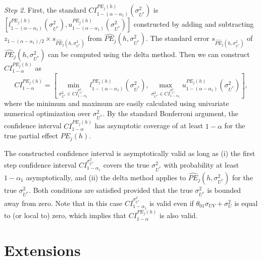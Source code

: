 \documentclass[11pt]{article}
\begin{document}
\noindent \textit{Step 2}. First, the standard $CI_{1-\left( \alpha -\alpha
_{1}\right) }^{PE_{j}(h)}\left( \sigma _{U^{\ast }}^{2}\right) $ is $\left[
l_{1-\left( \alpha -\alpha _{1}\right) }^{PE_{j}(h)}\left( \sigma _{U^{\ast
}}^{2}\right) ,u_{1-\left( \alpha -\alpha _{1}\right) }^{PE_{j}(h)}\left(
\sigma _{U^{\ast }}^{2}\right) \right]$ constructed by adding and
subtracting $z_{1-(\alpha -\alpha _{1})/2}\times s_{\widehat{PE}%
_{j}(h,\sigma _{U^{\ast }}^{2})}$ from $\widehat{PE}_{j}(h,\sigma _{U^{\ast
}}^{2})$. The standard error $s_{\widehat{PE}_{j}(h,\sigma _{U^{\ast
}}^{2})} $ of $\widehat{PE}_{j}(h,\sigma _{U^{\ast }}^{2})$ can be computed
using the delta method. Then we can construct $CI_{1-\alpha }^{PE_{j}(h)}$
as 
\begin{equation*}
CI_{1-\alpha }^{PE_{j}(h)} = \left[\min_{\sigma _{U^{\ast }}^{2}\in
CI_{1-\alpha _{1}}^{\sigma _{U^{\ast }}^{2}}}l_{1-\left( \alpha -\alpha
_{1}\right) }^{PE_{j}(h)}\left( \sigma _{U^{\ast }}^{2}\right) ,
\max_{\sigma _{U^{\ast }}^{2}\in CI_{1-\alpha _{1}}^{\sigma _{U^{\ast
}}^{2}}}u_{1-\left( \alpha -\alpha _{1}\right) }^{PE_{j}(h)}\left( \sigma
_{U^{\ast }}^{2}\right)\right] ,
\end{equation*}%
where the minimum and maximum are easily calculated using univariate
numerical optimization over $\sigma _{U^{\ast }}^{2}$. By the standard
Bonferroni argument, the confidence interval $CI_{1-\alpha }^{PE_{j}(h)}$
has asymptotic coverage of at least $1-\alpha $ for the true partial effect $%
PE_{j}(h)$.

\smallskip

The constructed confidence interval is asymptotically valid as long as (i)
the first step confidence interval $CI_{1-\alpha _{1}}^{\sigma _{U^{\ast
}}^{2}}$ covers the true $\sigma _{U^{\ast }}^{2}$ with probability at least 
$1-\alpha _{1}$ asymptotically, and (ii) the delta method applies to $%
\widehat{PE}_{j}(h,\sigma _{U^{\ast }}^{2})$ for the true $\sigma _{U^{\ast
}}^{2}$. Both conditions are satisfied provided that the true $\sigma
_{U^{\ast }}^{2}$ is bounded away from zero. Note that in this case $%
CI_{1-\alpha _{1}}^{\sigma _{U^{\ast }}^{2}}$ is valid even if $\theta
_{01}\sigma _{UV}+\sigma _{U}^{2}$ is equal to (or local to) zero, which
implies that $CI_{1-\alpha }^{PE_{j}(h)}$ is also valid.

\section{Extensions\label{sec:Extensions}}
\end{document}
